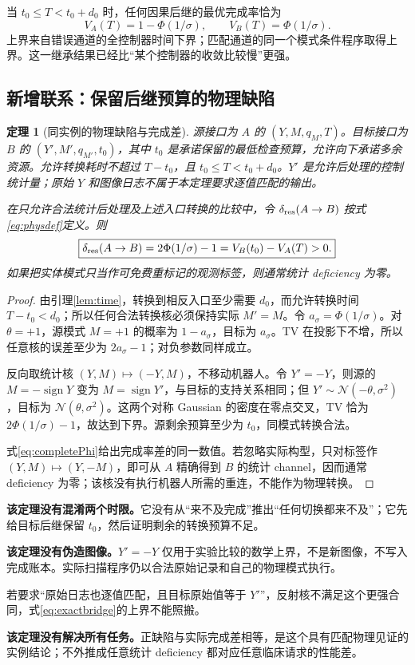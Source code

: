 \documentclass[UTF8,11pt,a4paper,fontset=fandol]{ctexart}
\numberwithin{equation}{section}
\newtheorem{theorem}{定理}[section]
\theoremstyle{definition}
\newcommand{\N}{\mathcal N}
\begin{document}
当 $t_0\le T<t_0+d_0$ 时，任何因果后继的最优完成率恰为
\begin{equation}
V_A(T)=1-\Phi(1/\sigma),\qquad
V_B(T)=\Phi(1/\sigma).
\label{eq:completePhi}
\end{equation}
上界来自错误通道的全控制器时间下界；匹配通道的同一个模式条件程序取得上界。这一继承结果已经比“某个控制器的收敛比较慢”更强。

\subsection{新增联系：保留后继预算的物理缺陷}
\begin{theorem}[同实例的物理缺陷与完成差]
\label{thm:matchedgap}
源接口为 $A$ 的 $(Y,M,q_M,T)$。目标接口为 $B$ 的 $(Y',M',q_{M'},t_0)$，其中 $t_0$ 是承诺保留的最低检查预算，允许向下承诺多余资源。允许转换耗时不超过 $T-t_0$，且 $t_0\le T<t_0+d_0$。$Y'$ 是允许后处理的控制统计量；原始 $Y$ 和图像日志不属于本定理要求逐值匹配的输出。

在只允许合法统计后处理及上述入口转换的比较中，令 $\delta_{\rm res}(A\to B)$ 按式\eqref{eq:physdef}定义。则
\begin{equation}
\boxed{\delta_{\rm res}(A\to B)
=2\Phi(1/\sigma)-1
=V_B(t_0)-V_A(T)>0.}
\label{eq:exactbridge}
\end{equation}
如果把实体模式只当作可免费重标记的观测标签，则通常统计 deficiency 为零。
\end{theorem}
\begin{proof}
由引理\ref{lem:time}，转换到相反入口至少需要 $d_0$，而允许转换时间 $T-t_0<d_0$；所以任何合法转换核必须保持实际 $M'=M$。令 $a_\sigma=\Phi(1/\sigma)$。对 $\theta=+1$，源模式 $M=+1$ 的概率为 $1-a_\sigma$，目标为 $a_\sigma$。TV 在投影下不增，所以任意核的误差至少为 $2a_\sigma-1$；对负参数同样成立。

反向取统计核 $(Y,M)\mapsto(-Y,M)$，不移动机器人。令 $Y'=-Y$，则源的 $M=-\operatorname{sign}Y$ 变为 $M=\operatorname{sign}Y'$，与目标的支持关系相同；但 $Y'\sim\N(-\theta,\sigma^2)$，目标为 $\N(\theta,\sigma^2)$。这两个对称 Gaussian 的密度在零点交叉，TV 恰为 $2\Phi(1/\sigma)-1$，故达到下界。源剩余预算至少为 $t_0$，同模式转换合法。

式\eqref{eq:completePhi}给出完成率差的同一数值。若忽略实际构型，只对标签作 $(Y,M)\mapsto(Y,-M)$，即可从 $A$ 精确得到 $B$ 的统计 channel，因而通常 deficiency 为零；该核没有执行机器人所需的重连，不能作为物理转换。\end{proof}

\begin{scopebox}
\textbf{该定理没有混淆两个时限。}它没有从“来不及完成”推出“任何切换都来不及”；它先给目标后继保留 $t_0$，然后证明剩余的转换预算不足。\par
\textbf{该定理没有伪造图像。}$Y'=-Y$ 仅用于实验比较的数学上界，不是新图像，不写入完成账本。实际扫描程序仍以合法原始记录和自己的物理模式执行。\par
若要求“原始日志也逐值匹配，且目标原始值等于 $Y'$”，反射核不满足这个更强合同，式\eqref{eq:exactbridge}的上界不能照搬。\par
\textbf{该定理没有解决所有任务。}正缺陷与实际完成差相等，是这个具有匹配物理见证的实例结论；不外推成任意统计 deficiency 都对应任意临床请求的性能差。
\end{scopebox}
\end{document}
